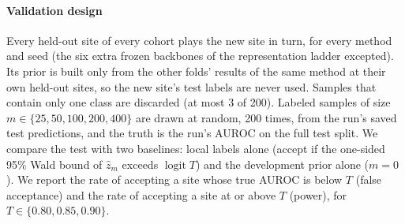 \paragraph{Validation design} Every held-out site of every cohort plays the
new site in turn, for every method and seed (the six extra frozen backbones of
the representation ladder excepted). Its prior is built only from the other
folds' results of the same method at their own held-out sites, so the new
site's test labels are never used. Samples that contain only one class are
discarded (at most 3 of 200). Labeled samples of size $m\in\{25,50,100,200,400\}$ are drawn at
random, 200 times, from the run's saved test predictions, and the truth is the
run's AUROC on the full test split. We compare the test with two baselines:
local labels alone (accept if the one-sided 95\% Wald bound of $\hat z_m$ exceeds
$\operatorname{logit}T$) and the development prior alone ($m=0$). We report
the rate of accepting a site whose true AUROC is below $T$ (false acceptance)
and the rate of accepting a site at or above $T$ (power), for
$T\in\{0.80,0.85,0.90\}$.
